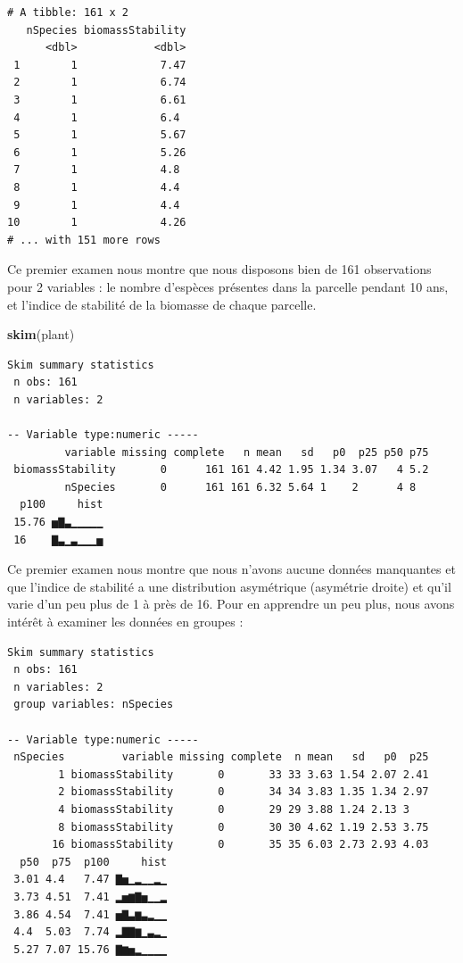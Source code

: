 \documentclass[a4paperpaper,]{article}
\newenvironment{Shaded}{\begin{snugshade}}{\end{snugshade}}
\newcommand{\KeywordTok}[1]{\textcolor[rgb]{0.12,0.11,0.11}{\textbf{#1}}}
\newcommand{\NormalTok}[1]{\textcolor[rgb]{0.12,0.11,0.11}{#1}}
\newcommand{\OperatorTok}[1]{\textcolor[rgb]{0.12,0.11,0.11}{#1}}
\newcommand{\StringTok}[1]{\textcolor[rgb]{0.75,0.01,0.01}{#1}}
\begin{document}
\begin{verbatim}
# A tibble: 161 x 2
   nSpecies biomassStability
      <dbl>            <dbl>
 1        1             7.47
 2        1             6.74
 3        1             6.61
 4        1             6.4 
 5        1             5.67
 6        1             5.26
 7        1             4.8 
 8        1             4.4 
 9        1             4.4 
10        1             4.26
# ... with 151 more rows
\end{verbatim}

Ce premier examen nous montre que nous disposons bien de 161 observations pour 2 variables : le nombre d'espèces présentes dans la parcelle pendant 10 ans, et l'indice de stabilité de la biomasse de chaque parcelle.

\begin{Shaded}
\begin{Highlighting}[]
\KeywordTok{skim}\NormalTok{(plant)}
\end{Highlighting}
\end{Shaded}

\begin{verbatim}
Skim summary statistics
 n obs: 161 
 n variables: 2 

-- Variable type:numeric -----
         variable missing complete   n mean   sd   p0  p25 p50 p75
 biomassStability       0      161 161 4.42 1.95 1.34 3.07   4 5.2
         nSpecies       0      161 161 6.32 5.64 1    2      4 8  
  p100     hist
 15.76 ▅▇▃▁▁▁▁▁
 16    ▇▃▁▃▁▁▁▅
\end{verbatim}

Ce premier examen nous montre que nous n'avons aucune données manquantes et que l'indice de stabilité a une distribution asymétrique (asymétrie droite) et qu'il varie d'un peu plus de 1 à près de 16. Pour en apprendre un peu plus, nous avons intérêt à examiner les données en groupes :

\begin{Shaded}
\end{Shaded}

\begin{verbatim}
Skim summary statistics
 n obs: 161 
 n variables: 2 
 group variables: nSpecies 

-- Variable type:numeric -----
 nSpecies         variable missing complete  n mean   sd   p0  p25
        1 biomassStability       0       33 33 3.63 1.54 2.07 2.41
        2 biomassStability       0       34 34 3.83 1.35 1.34 2.97
        4 biomassStability       0       29 29 3.88 1.24 2.13 3   
        8 biomassStability       0       30 30 4.62 1.19 2.53 3.75
       16 biomassStability       0       35 35 6.03 2.73 2.93 4.03
  p50  p75  p100     hist
 3.01 4.4   7.47 ▇▅▁▂▁▁▂▁
 3.73 4.51  7.41 ▂▅▆▇▅▁▁▂
 3.86 4.54  7.41 ▅▇▃▆▃▂▁▁
 4.4  5.03  7.74 ▂▇▇▆▁▃▂▁
 5.27 7.07 15.76 ▇▆▅▂▁▁▁▁
\end{verbatim}
\end{document}
